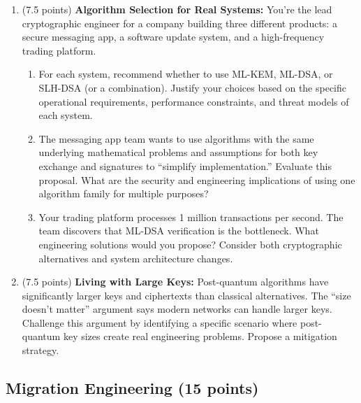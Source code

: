 \documentclass[10pt,a4paper,american]{exam}
\begin{document}
\begin{enumerate}
	\item (7.5 points) \textbf{Algorithm Selection for Real Systems:}
	      You're the lead cryptographic engineer for a company building three different products: a secure messaging app, a software update system, and a high-frequency trading platform.
	      \begin{enumerate}
		      \item For each system, recommend whether to use ML-KEM, ML-DSA, or SLH-DSA (or a combination). Justify your choices based on the specific operational requirements, performance constraints, and threat models of each system.
		      \item The messaging app team wants to use algorithms with the same underlying mathematical problems and assumptions for both key exchange and signatures to ``simplify implementation.'' Evaluate this proposal. What are the security and engineering implications of using one algorithm family for multiple purposes?
		      \item Your trading platform processes 1 million transactions per second. The team discovers that ML-DSA verification is the bottleneck. What engineering solutions would you propose? Consider both cryptographic alternatives and system architecture changes.
	      \end{enumerate}
	\item (7.5 points) \textbf{Living with Large Keys:}
	      Post-quantum algorithms have significantly larger keys and ciphertexts than classical alternatives. The ``size doesn't matter'' argument says modern networks can handle larger keys. Challenge this argument by identifying a specific scenario where post-quantum key sizes create real engineering problems. Propose a mitigation strategy.
\end{enumerate}

\subsection{Migration Engineering (15 points)}
\end{document}
